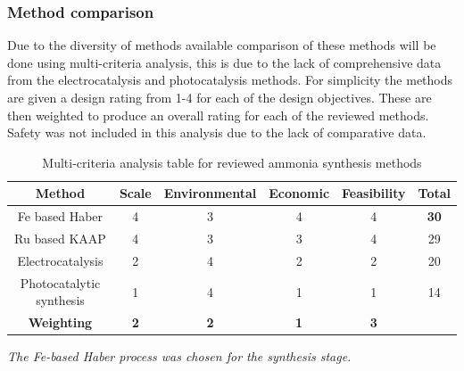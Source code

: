 \documentclass[11pt, a4paper]{article}
\begin{document}
{\subsubsection{Method comparison}
Due to the diversity of methods available comparison of these methods will be done using multi-criteria analysis, this is due to the lack of comprehensive data from the electrocatalysis and photocatalysis methods. For simplicity the methods are given a design rating from 1-4 for each of the design objectives. These are then weighted to produce an overall rating for each of the reviewed methods. Safety was not included in this analysis due to the lack of comparative data.
\begin{table}[!htbp]
	\begin{center}
		
		\caption{Multi-criteria analysis table for reviewed ammonia synthesis methods \label{tab:MCA}}
		
		\begin{tabular}{|c|c|c|c|c|c|}
			\hline
			Method& Scale & Environmental & Economic   & Feasibility & Total \\ \hline
			Fe based Haber           & 4              & 3                          & 4 & 4             & \textbf{30}                     \\ \hline
			Ru based KAAP            & 4                & 3                        & 3 & 4         & 29                     \\ \hline
			Electrocatalysis            & 2                & 4                        & 2 & 2         & 20                     \\ \hline
			Photocatalytic synthesis            & 1                & 4                        & 1 & 1         & 14                  \\ \hline \hline
				\textbf{Weighting}& \textbf{2} & \textbf{2} & \textbf{1}   & \textbf{3} &  \\ \hline

		\end{tabular}
	\smallskip
	
	\textit{The Fe-based Haber process was chosen for the synthesis stage.}
	\end{center}
\end{table}

}
\end{document}
